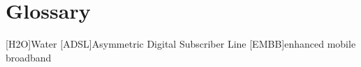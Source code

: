 \chapter{Glossary}

\footnotesize
\SingleSpacing

\begin{multicols}{2}
\begin{acronym}[AAAAAA]

	[H2O]{Water}
	[ADSL]{Asymmetric Digital Subscriber Line}
	[EMBB]{enhanced mobile broadband}

\end{acronym}
\end{multicols}

